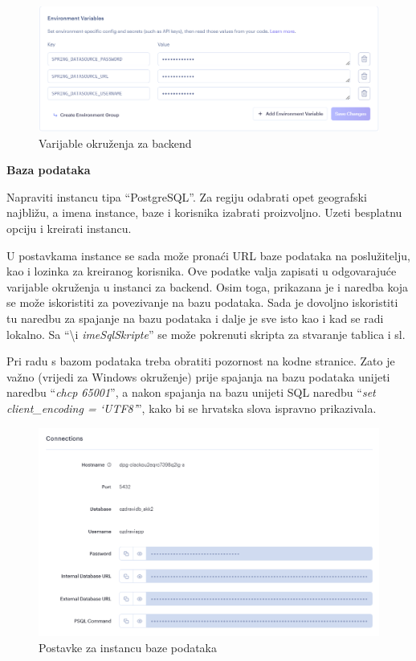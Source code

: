 			 \begin{figure}[H]
				\includegraphics[width=\textwidth]{slike/environmentBe.png} %
				\caption{Varijable okruženja za backend}
				\label{fig:beEnv} %
			 \end{figure}
			 
			 \textbf{Baza podataka}
			 
			 Napraviti instancu tipa “PostgreSQL”. Za regiju odabrati opet geografski najbližu, a imena instance, baze i korisnika izabrati proizvoljno. Uzeti besplatnu opciju i kreirati instancu.
			 
			 U postavkama instance se sada može pronaći URL baze podataka na poslužitelju, kao i lozinka za kreiranog korisnika. Ove podatke valja zapisati u odgovarajuće varijable okruženja u instanci za backend. Osim toga, prikazana je i naredba koja se može iskoristiti za povezivanje na bazu podataka. Sada je dovoljno iskoristiti tu naredbu za spajanje na bazu podataka i dalje je sve isto kao i kad se radi lokalno. Sa “\textbackslash i  \textit{imeSqlSkripte}” se može pokrenuti skripta za stvaranje tablica i sl.
			 
			 Pri radu s bazom podataka treba obratiti pozornost na kodne stranice. Zato je važno (vrijedi za Windows okruženje) prije spajanja na bazu podataka unijeti naredbu “\textit{chcp 65001}”, a nakon spajanja na bazu unijeti SQL naredbu “\textit{set client\_encoding = ‘UTF8’}”, kako bi se hrvatska slova ispravno prikazivala.
			 
			 \begin{figure}[H]
				\includegraphics[width=\textwidth]{slike/bazaDeploy.png} %
				\caption{Postavke za instancu baze podataka}
				\label{fig:bazaDeploy} %
			 \end{figure}
			 
